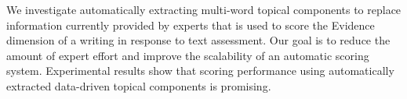 We investigate automatically extracting multi-word topical components to replace information currently provided by experts that is used to score the Evidence dimension of a writing in response to text assessment. Our goal is to reduce the amount of expert effort and improve the scalability of an automatic scoring system. Experimental results show that scoring performance using automatically extracted data-driven topical components is promising.
